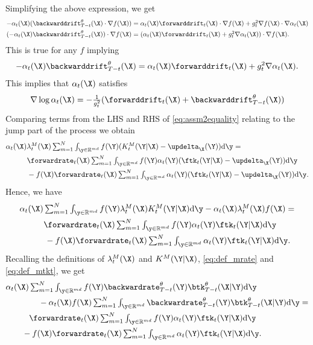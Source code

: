 Simplifying the above expression, we get
\begin{align}
    -\alpha_t(\X) ( \backwarddrift_{T-t}^\theta(\X) \cdot \nabla f(\X)) &\textstyle = \alpha_t(\X) \forwarddrift_t(\X) \cdot \nabla f(\X) + g_t^2 \nabla f(\X) \cdot \nabla \alpha_t(\X)\\
    (-\alpha_t(\X) \backwarddrift_{T-t}^\theta(\X)) \cdot \nabla f(\X) &\textstyle = ( \alpha_t(\X) \forwarddrift_t(\X) + g_t^2 \nabla \alpha_t(\X) ) \cdot \nabla f(\X) . 
\end{align}
This is true for any $f$ implying
\begin{align}
    -\alpha_t(\X) \backwarddrift_{T-t}^\theta(\X) = \alpha_t(\X) \forwarddrift_t(\X) + g_t^2 \nabla \alpha_t(\X) . 
\end{align}
This implies that $\alpha_t(\X)$ satisfies 
\begin{equation}
  \textstyle 
    \nabla \log \alpha_t(\X) = - \frac{1}{g_t^2} ( \forwarddrift_t(\X) + \backwarddrift_{T-t}^\theta (\X))
    \label{eq:alphaDiffRelation}
\end{equation}
Comparing terms from the LHS and RHS of \eqref{eq:assm2equality} relating to the jump part of the process we obtain
\begin{align}
    &\textstyle \alpha_t(\X) \mrate_t(\X) \inty f(\Y) ( \mtk_t(\Y | \X) - \updelta_{\X}(\Y) ) \rmd \y = \\
    &\textstyle  \hspace{1cm} \forwardrate_t(\X) \inty f(\Y) \alpha_t(\Y) ( \ftk_t(\Y | \X) - \updelta_{\X}(\Y) ) \rmd \y\\
    &\textstyle  \hspace{1cm} - f(\X) \forwardrate_t(\X) \inty \alpha_t(\Y) ( \ftk_t(\Y | \X) - \updelta_{\X}(\Y) ) \rmd \y .
\end{align}
Hence, we have 
\begin{align}
    &\textstyle \alpha_t(\X)  \inty f(\Y) \mrate_t(\X) \mtk_t(\Y | \X) \rmd \y - \alpha_t(\X) \mrate_t(\X) f(\X) = \\
    &\textstyle  \hspace{1cm} \forwardrate_t(\X) \inty f(\Y) \alpha_t(\Y) \ftk_t(\Y | \X) \rmd \y \\
  & \qquad \quad \textstyle - f(\X) \forwardrate_t(\X) \inty \alpha_t(\Y) \ftk_t(\Y | \X) \rmd \y . 
\end{align}
Recalling the definitions of $\mrate_t(\X)$ and $\mtk(\Y | \X)$, \eqref{eq:def_mrate} and \eqref{eq:def_mtkt}, we get 
\begin{align}
  &\textstyle \alpha_t(\X) \inty f(\Y) \backwardrate_{T-t}^\theta(\Y) \btk_{T-t}^\theta(\X | \Y) \rmd \y \\
  & \qquad \qquad \textstyle - \alpha_t(\X) f(\X) \inty \backwardrate_{T-t}^\theta(\Y) \btk_{T-t}^\theta(\X | \Y) \rmd \y = \\
  &\textstyle  \hspace{1cm} \forwardrate_t(\X) \inty f(\Y) \alpha_t(\Y) \ftk_t(\Y | \X) \rmd \y \\
  & \qquad \textstyle - f(\X) \forwardrate_t(\X) \inty \alpha_t(\Y) \ftk_t(\Y | \X) \rmd \y .
\end{align}

